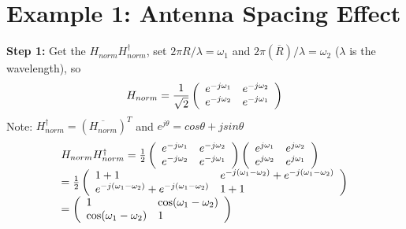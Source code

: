 \section{Example 1: Antenna Spacing Effect}

\textbf{Step 1:} Get the $H_{norm}H_{norm}^\dagger$, set $2{\pi}R/\lambda={\omega}_1$ and
$2{\pi}(\overline{R})/\lambda={\omega}_2$ ($\lambda$ is the wavelength), so
\begin{equation}
H_{norm} = \frac{1}{\sqrt 2 }\left( {{\begin{array}{*{20}c}
 {e^{ - j\omega _1 }} \hfill & {e^{ - j\omega _2 }} \hfill \\
 {e^{ - j\omega _2 }} \hfill & {e^{ - j\omega _1 }} \hfill \\
\end{array} }} \right)
\end{equation}
Note: $H_{norm}^\dagger=(\overline{H_{norm}})^T$ and $e^{j\theta}=cos\theta +jsin\theta$
\begin{equation}
\begin{array}{l}
 H_{norm}H_{norm}^\dagger = \frac{1}{2}\left( {{\begin{array}{*{20}c}
 {e^{ - j\omega _1 }} \hfill & {e^{ - j\omega _2 }} \hfill \\
 {e^{ - j\omega _2 }} \hfill & {e^{ - j\omega _1 }} \hfill \\
\end{array} }} \right)\left( {{\begin{array}{*{20}c}
 {e^{j\omega _1 }} \hfill & {e^{j\omega _2 }} \hfill \\
 {e^{j\omega _2 }} \hfill & {e^{j\omega _1 }} \hfill \\
\end{array} }} \right) \\
 = \frac{1}{2}\left( {{\begin{array}{*{20}c}
 {1 + 1} \hfill & {e^{ - j(\omega _1 - \omega _2 )} + e^{ - j(\omega _1 -
\omega _2 )}} \hfill \\
 {e^{ - j(\omega _1 - \omega _2 )} + e^{ - j(\omega _1 - \omega _2 )}}
\hfill & {1 + 1} \hfill \\
\end{array} }} \right) \\
 = \left( {{\begin{array}{*{20}c}
 1 \hfill & {\cos (\omega _1 - \omega _2 )} \hfill \\
 {\cos (\omega _1 - \omega _2 )} \hfill & 1 \hfill \\
\end{array} }} \right) \\
 \end{array}
\end{equation}
